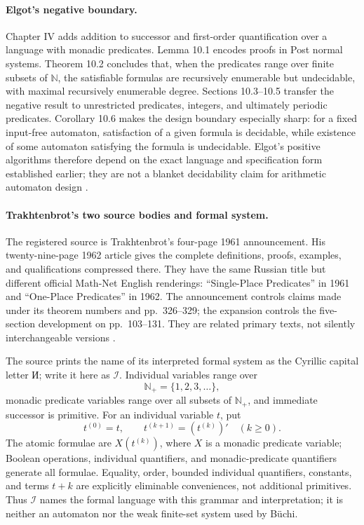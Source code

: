 \paragraph{Elgot's negative boundary.}
Chapter IV adds addition to successor and first-order quantification over a
language with monadic predicates.  Lemma 10.1 encodes proofs in Post normal
systems.  Theorem 10.2 concludes that, when the predicates range over finite
subsets of \(\mathbb N\), the satisfiable formulas are recursively enumerable
but undecidable, with maximal recursively enumerable degree.  Sections
10.3--10.5 transfer the negative result to unrestricted predicates, integers,
and ultimately periodic predicates.  Corollary 10.6 makes the design boundary
especially sharp: for a fixed input-free automaton, satisfaction of a given
formula is decidable, while existence of some automaton satisfying the formula
is undecidable.  Elgot's positive algorithms therefore depend on the exact
language and specification form established earlier; they are not a blanket
decidability claim for arithmetic automaton design
\cite[pp.~47--50]{Elgot1961}.

\paragraph{Trakhtenbrot's two source bodies and formal system.}
The registered source is Trakhtenbrot's four-page 1961 announcement.  His
twenty-nine-page 1962 article gives the complete definitions, proofs, examples,
and qualifications compressed there.  They have the same Russian title but
different official Math-Net English renderings:
\enquote{Single-Place Predicates} in 1961 and
\enquote{One-Place Predicates} in 1962.  The announcement controls claims
made under its theorem numbers and pp.~326--329; the expansion controls the
five-section development on pp.~103--131.  They are related primary texts, not
silently interchangeable versions
\cite{Trakhtenbrot1961,Trakhtenbrot1962Expanded}.

The source prints the name of its interpreted formal system as the Cyrillic
capital letter И; write it here as \(\mathcal I\).  Individual variables range
over
\[
  \mathbb N_{+}=\{1,2,3,\ldots\},
\]
monadic predicate variables range over all subsets of \(\mathbb N_{+}\), and
immediate successor is primitive.  For an individual variable \(t\), put
\[
 t^{(0)}=t,
 \qquad
 t^{(k+1)}=(t^{(k)})'
 \quad(k\geq0).
\]
The atomic formulae are \(X(t^{(k)})\), where \(X\) is a monadic predicate
variable; Boolean operations, individual quantifiers, and monadic-predicate
quantifiers generate all formulae.  Equality, order, bounded individual
quantifiers, constants, and terms \(t+k\) are explicitly eliminable
conveniences, not additional primitives.  Thus \(\mathcal I\) names the formal
language with this grammar and interpretation; it is neither an automaton nor
the weak finite-set system used by B\"uchi.

